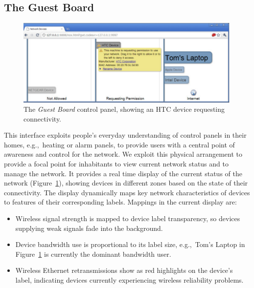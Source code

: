 


\subsection{The Guest Board} \label{s:guest-board}


\begin{figure} 
  \centering 
  \includegraphics[width=0.9\columnwidth]{homework_guest_board}
  \caption{\label{f:guest-board}The \emph{Guest Board} control panel, showing an
    HTC device requesting connectivity.}
\end{figure}

This interface exploits people's everyday understanding of control panels in
their homes, e.g.,~heating or alarm panels, to provide users with a central
point of awareness and control for the network. We exploit this physical arrangement to
provide a focal point for inhabitants to view current network status and to
manage the network.  It provides a real time display of the current status of
the network (Figure~\ref{f:guest-board}), showing devices in different zones
based on the state of their connectivity.  The display dynamically maps key
network characteristics of devices to features of their corresponding labels.
Mappings in the current display are: 

\begin{itemize}
\item Wireless signal strength is mapped to device label transparency, so
      devices supplying weak signals fade into the background.
\item Device bandwidth use is proportional to its label size, e.g.,~Tom's Laptop
      in Figure~\ref{f:guest-board} is currently the dominant bandwidth user. 
\item Wireless Ethernet retransmissions show as red highlights on the device's
  label, indicating devices currently experiencing wireless reliability problems. 
\end{itemize}

